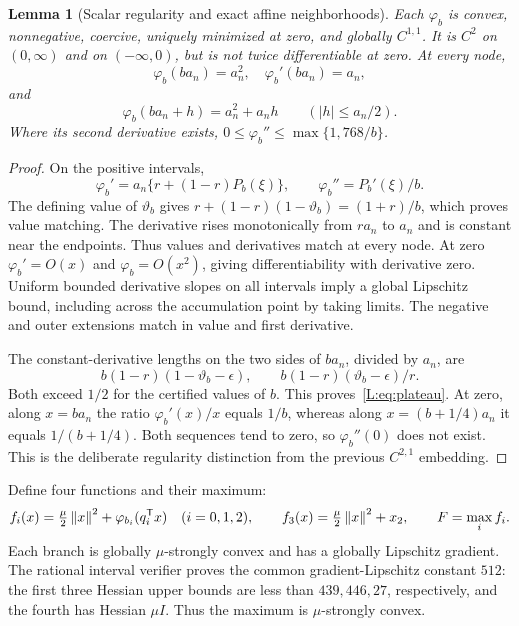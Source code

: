 \documentclass[10pt,oneside,openany]{book}
\newtheorem{lemma}{Lemma}[chapter]
\theoremstyle{remark}\newtheorem{remark}{Remark}[chapter]
\begin{document}
\begin{lemma}[Scalar regularity and exact affine neighborhoods]\label{L:lem:scalar}
Each $\varphi_b$ is convex, nonnegative, coercive, uniquely minimized at zero, and globally $C^{1,1}$. It is $C^2$ on $(0,\infty)$ and on $(-\infty,0)$, but is not twice differentiable at zero. At every node,
\[
 \varphi_b(ba_n)=a_n^2,\quad \varphi_b'(ba_n)=a_n,
\]
and
\begin{equation}\label{L:eq:plateau}
 \varphi_b(ba_n+h)=a_n^2+a_nh\qquad (|h|\le a_n/2).
\end{equation}
Where its second derivative exists, $0\le\varphi_b''\le\max\{1,768/b\}$.
\end{lemma}
\begin{proof}
On the positive intervals,
\[
 \varphi_b'=a_n\{r+(1-r)P_b(\xi)\},\qquad
 \varphi_b''=P_b'(\xi)/b.
\]
The defining value of $\vartheta_b$ gives
$r+(1-r)(1-\vartheta_b)=(1+r)/b$, which proves value matching. The derivative rises monotonically from $ra_n$ to $a_n$ and is constant near the endpoints. Thus values and derivatives match at every node. At zero $\varphi_b'=O(x)$ and $\varphi_b=O(x^2)$, giving differentiability with derivative zero. Uniform bounded derivative slopes on all intervals imply a global Lipschitz bound, including across the accumulation point by taking limits. The negative and outer extensions match in value and first derivative.

The constant-derivative lengths on the two sides of $ba_n$, divided by $a_n$, are
\[
 b(1-r)(1-\vartheta_b-\epsilon),\qquad
 b(1-r)(\vartheta_b-\epsilon)/r.
\]
Both exceed $1/2$ for the certified values of $b$. This proves~\eqref{L:eq:plateau}. At zero, along $x=ba_n$ the ratio $\varphi_b'(x)/x$ equals $1/b$, whereas along $x=(b+1/4)a_n$ it equals $1/(b+1/4)$. Both sequences tend to zero, so $\varphi_b''(0)$ does not exist. This is the deliberate regularity distinction from the previous $C^{2,1}$ embedding.
\end{proof}

Define four functions and their maximum:
\begin{equation}\label{L:eq:embedding}
 f_i(x)=\tfrac\mu2\left\lVert x\right\rVert^2+\varphi_{b_i}(q_i^{\mathsf T} x)\quad (i=0,1,2),\qquad
 f_3(x)=\tfrac\mu2\left\lVert x\right\rVert^2+x_2,\qquad F=\max_i f_i.
\end{equation}
Each branch is globally $\mu$-strongly convex and has a globally Lipschitz gradient. The rational interval verifier proves the common gradient-Lipschitz constant $512$: the first three Hessian upper bounds are less than $439,446,27$, respectively, and the fourth has Hessian $\mu I$. Thus the maximum is $\mu$-strongly convex.
\end{document}
